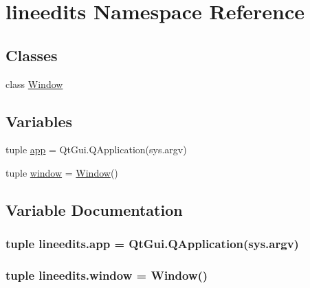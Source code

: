 \hypertarget{namespacelineedits}{}\section{lineedits Namespace Reference}
\label{namespacelineedits}
\subsection*{Classes}
\begin{DoxyCompactItemize}
\item 
class \hyperlink{classlineedits_1_1Window}{Window}
\end{DoxyCompactItemize}
\subsection*{Variables}
\begin{DoxyCompactItemize}
\item 
tuple \hyperlink{namespacelineedits_a73049327b22f70a0046881597b3a2e18}{app} = Qt\+Gui.\+Q\+Application(sys.\+argv)
\item 
tuple \hyperlink{namespacelineedits_a951fe27b9665bb3808a995f23a4c97e2}{window} = \hyperlink{classlineedits_1_1Window}{Window}()
\end{DoxyCompactItemize}


\subsection{Variable Documentation}
\hypertarget{namespacelineedits_a73049327b22f70a0046881597b3a2e18}{}
\subsubsection[{app}]{\setlength{\rightskip}{0pt plus 5cm}tuple lineedits.\+app = Qt\+Gui.\+Q\+Application(sys.\+argv)}\label{namespacelineedits_a73049327b22f70a0046881597b3a2e18}
\hypertarget{namespacelineedits_a951fe27b9665bb3808a995f23a4c97e2}{}
\subsubsection[{window}]{\setlength{\rightskip}{0pt plus 5cm}tuple lineedits.\+window = {\bf Window}()}\label{namespacelineedits_a951fe27b9665bb3808a995f23a4c97e2}
